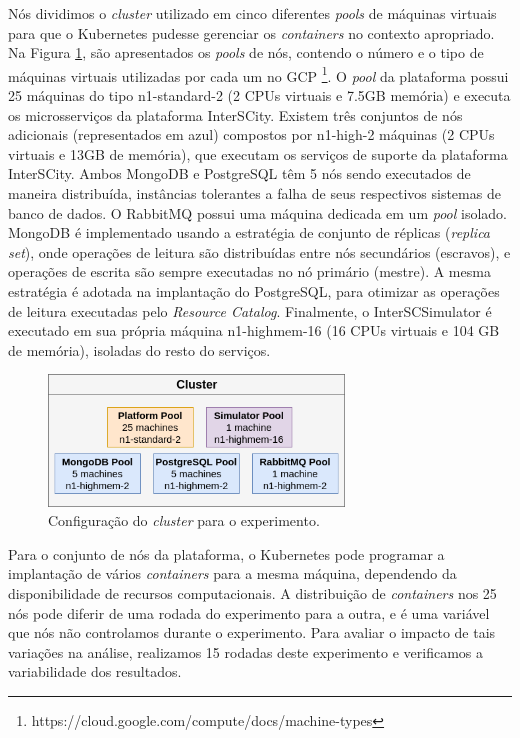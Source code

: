Nós dividimos o \textit{cluster} utilizado em cinco diferentes \textit{pools} de máquinas virtuais para que o Kubernetes pudesse gerenciar os \textit{containers} no contexto apropriado.
Na Figura \ref{fig:node-pools}, são apresentados os \textit{pools} de nós, contendo o número e o tipo de máquinas virtuais utilizadas por cada um no GCP
\footnote{https://cloud.google.com/compute/docs/machine-types}.
O \textit{pool} da plataforma possui 25 máquinas do tipo n1-standard-2 (2 CPUs virtuais e 7.5GB memória) e executa os microsserviços da plataforma InterSCity.
Existem três conjuntos de nós adicionais (representados em azul) compostos por n1-high-2 máquinas (2 CPUs virtuais e 13GB de memória), que executam os serviços de suporte da plataforma InterSCity.
Ambos MongoDB e PostgreSQL têm 5 nós sendo executados de maneira distribuída, instâncias tolerantes a falha de seus respectivos sistemas de banco de dados.
O RabbitMQ possui uma máquina dedicada em um \textit{pool} isolado.
MongoDB é implementado usando a estratégia de conjunto de réplicas (\textit{replica set}), onde operações de leitura são distribuídas entre nós secundários (escravos), e operações de escrita são
sempre executadas no nó primário (mestre).
A mesma estratégia é adotada na implantação do PostgreSQL, para otimizar as operações de leitura executadas pelo \textit{Resource Catalog}.
Finalmente, o InterSCSimulator é executado em sua própria máquina n1-highmem-16 (16 CPUs virtuais e 104 GB de memória), isoladas do resto do serviços.

\begin{figure}[ht]
	\centering
	\includegraphics[width=0.7\textwidth]{figuras/node-pools.png}
    \caption{Configuração do \textit{cluster} para o experimento.}
	\label{fig:node-pools}
\end{figure}


Para o conjunto de nós da plataforma, o Kubernetes pode programar a implantação de vários \textit{containers} para a mesma máquina, dependendo da disponibilidade de recursos computacionais.
A distribuição de \textit{containers} nos 25 nós pode diferir de uma rodada do experimento para a outra, e é uma variável que nós não controlamos durante o experimento.
Para avaliar o impacto de tais variações na análise, realizamos 15 rodadas deste experimento e verificamos a variabilidade dos resultados.

